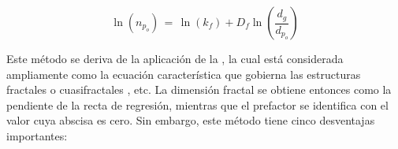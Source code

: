 \begin{equation}
\ln(n_{p_o})\,=\,\ln(k_{f})+D_{f}\ln(\frac{d_{g}}{d_{p_o}})
\label{eq:leydepotencias}
\end{equation}

\par Este método se deriva de la aplicación de la , la cual está considerada ampliamente como la ecuación característica que gobierna las estructuras fractales o cuasifractales \cite{samsometal:1987,caietal:1995,koyluetal:1995}, etc. La dimensión fractal  se obtiene entonces como la pendiente de la recta de regresión, mientras que el prefactor  se identifica con el valor cuya abscisa es cero. Sin embargo, este método tiene cinco desventajas importantes:

